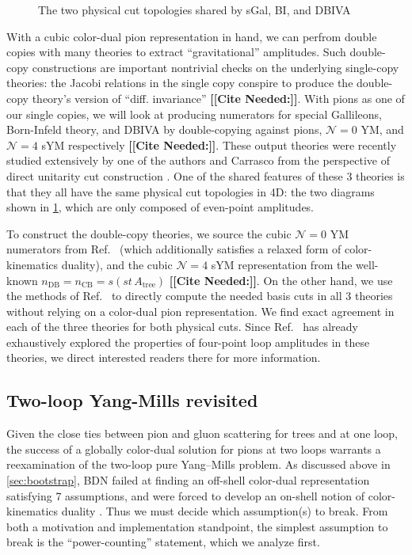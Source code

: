 \documentclass[11pt,letter]{article}
\newcommand{\citepls}[1]{{\bf\color{red}[[Cite Needed:#1]]}}
\begin{document}
\begin{figure}
  \begin{center}
	\PhysicalCutOne{}{}{}{} \PhysicalCutTwo{}{}{}{}
  \end{center}
  \caption{The two physical cut topologies shared by sGal, BI, and DBIVA}
  \label{fig:emu}
\end{figure}

With a cubic color-dual pion representation in hand, we can perfrom
double copies with many theories to extract ``gravitational''
amplitudes.  Such double-copy constructions are important nontrivial
checks on the underlying single-copy theories: the Jacobi relations in
the single copy conspire to produce the double-copy theory's version
of ``diff. invariance'' \citepls{}.  With pions as one of our single
copies, we will look at producing numerators for special Gallileons,
Born-Infeld theory, and DBIVA by double-copying against pions,
$\mathcal{N}=0$ YM, and $\mathcal{N}=4$ sYM respectively \citepls{}.
These output theories were recently studied extensively by one of the
authors and Carrasco from the perspective of direct unitarity cut
construction \cite{Carrasco:2023qgz}.  One of the shared features of
these 3 theories is that they all have the same physical cut
topologies in 4D: the two diagrams shown in \cref{fig:emu}, which are
only composed of even-point amplitudes.

To construct the double-copy theories, we source the cubic
$\mathcal{N}=0$ YM numerators from Ref.~\cite{Bern:2015ooa} (which
additionally satisfies a relaxed form of color-kinematics duality),
and the cubic $\mathcal{N}=4$ sYM representation from the well-known
$n_{\text{DB}} = n_{\text{CB}} = s (st\, A_{\text{tree}})$ \citepls{}.
On the other hand, we use the methods of Ref.~\cite{Carrasco:2023qgz}
to directly compute the needed basis cuts in all 3 theories without
relying on a color-dual pion representation.  We find exact agreement
in each of the three theories for both physical cuts.  Since
Ref.~\cite{Carrasco:2023qgz} has already exhaustively explored the
properties of four-point loop amplitudes in these theories, we direct
interested readers there for more information.



\subsection{Two-loop Yang-Mills revisited}
Given the close ties between pion and gluon scattering for trees and
at one loop, the success of a globally color-dual solution for pions
at two loops warrants a reexamination of the two-loop pure Yang--Mills
problem.  As discussed above in \cref{sec:bootstrap}, BDN failed at
finding an off-shell color-dual representation satisfying 7
assumptions, and were forced to develop an on-shell notion of
color-kinematics duality \cite{Bern:2015ooa}.  Thus we must decide
which assumption(s) to break.  From both a motivation and
implementation standpoint, the simplest assumption to break is the
``power-counting'' statement, which we analyze first.
\end{document}
